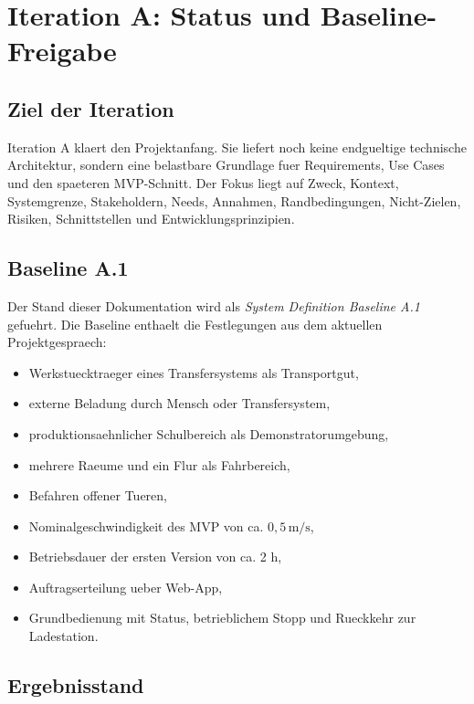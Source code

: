 \chapter{Iteration A: Status und Baseline-Freigabe}

\section{Ziel der Iteration}

Iteration A klaert den Projektanfang. Sie liefert noch keine endgueltige technische Architektur, sondern eine belastbare Grundlage fuer Requirements, Use Cases und den spaeteren MVP-Schnitt. Der Fokus liegt auf Zweck, Kontext, Systemgrenze, Stakeholdern, Needs, Annahmen, Randbedingungen, Nicht-Zielen, Risiken, Schnittstellen und Entwicklungsprinzipien.

\section{Baseline A.1}

Der Stand dieser Dokumentation wird als \emph{System Definition Baseline A.1} gefuehrt. Die Baseline enthaelt die Festlegungen aus dem aktuellen Projektgespraech:
\begin{itemize}
  \item Werkstuecktraeger eines Transfersystems als Transportgut,
  \item externe Beladung durch Mensch oder Transfersystem,
  \item produktionsaehnlicher Schulbereich als Demonstratorumgebung,
  \item mehrere Raeume und ein Flur als Fahrbereich,
  \item Befahren offener Tueren,
  \item Nominalgeschwindigkeit des MVP von ca. $0{,}5\,\mathrm{m/s}$,
  \item Betriebsdauer der ersten Version von ca. 2 h,
  \item Auftragserteilung ueber Web-App,
  \item Grundbedienung mit Status, betrieblichem Stopp und Rueckkehr zur Ladestation.
\end{itemize}

\section{Ergebnisstand}

